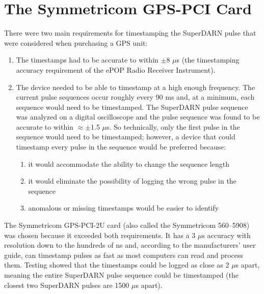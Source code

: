 \documentclass[11pt]{article}
\begin{document}
    \section{The Symmetricom GPS-PCI Card} \label{sec:gpscard}
    There were two main requirements for timestamping the SuperDARN pulse that were considered when purchasing a GPS unit:
    \begin{enumerate}
        \item The timestamps had to be accurate to within $\pm$8 $\mu$s (the timestamping accuracy requirement of the ePOP Radio Receiver Instrument).
        \item The device needed to be able to timestamp at a high enough frequency.
        The current pulse sequences occur roughly every 90 ms and, at a minimum, each sequence would need to be timestamped.
        The SuperDARN pulse sequence was analyzed on a digital oscilloscope and the pulse sequence was found to be accurate to within $\approx \pm$1.5 $\mu$s. So technically, only the first pulse in the sequence would need to be timestamped;
        however, a device that could timestamp every pulse in the sequence would be preferred because:
        \begin{enumerate}
            \item it would accommodate the ability to change the sequence length
            \item it would eliminate the possibility of logging the wrong pulse in the sequence
            \item anomalous or missing timestamps would be easier to identify
        \end{enumerate}
    \end{enumerate}

    The Symmetricom GPS-PCI-2U card (also called the Symmetricom 560--5908) was chosen because it exceeded both requirements.
    It has a 3 $\mu$s accuracy with resolution down to the hundreds of ns and, according to the manufacturers' user guide, can timestamp pulses as fast as most computers can read and process them.
    Testing showed that the timestamps could be logged as close as 2 $\mu$s apart, meaning the entire SuperDARN pulse sequence could be timestamped (the closest two SuperDARN pulses are 1500 $\mu$s apart).
\end{document}
